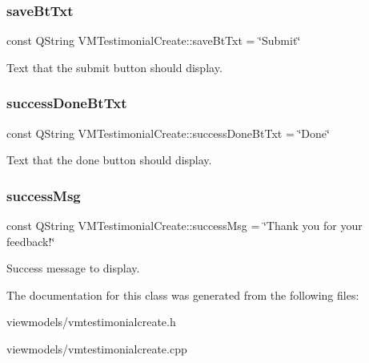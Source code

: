 \subsubsection{\texorpdfstring{saveBtTxt}{saveBtTxt}}
{\footnotesize\ttfamily const Q\+String V\+M\+Testimonial\+Create\+::save\+Bt\+Txt = \char`\"{}Submit\char`\"{}}

Text that the submit button should display. \mbox{\label{class_v_m_testimonial_create_afe5812a327160651286af17f65c62416}} 
\subsubsection{\texorpdfstring{successDoneBtTxt}{successDoneBtTxt}}
{\footnotesize\ttfamily const Q\+String V\+M\+Testimonial\+Create\+::success\+Done\+Bt\+Txt = \char`\"{}Done\char`\"{}}

Text that the done button should display. \mbox{\label{class_v_m_testimonial_create_ad496e34b013e7d4ee879f8bc8eaa434b}} 
\subsubsection{\texorpdfstring{successMsg}{successMsg}}
{\footnotesize\ttfamily const Q\+String V\+M\+Testimonial\+Create\+::success\+Msg = \char`\"{}Thank you for your feedback!\char`\"{}}

Success message to display. 

The documentation for this class was generated from the following files\+:\begin{DoxyCompactItemize}
\item 
viewmodels/vmtestimonialcreate.\+h\item 
viewmodels/vmtestimonialcreate.\+cpp\end{DoxyCompactItemize}
